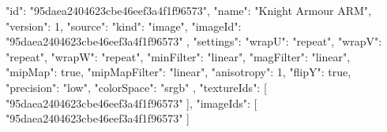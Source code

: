 {
  "id": "95daea2404623cbe46eef3a4f1f96573",
  "name": "Knight Armour ARM",
  "version": 1,
  "source": {
    "kind": "image",
    "imageId": "95daea2404623cbe46eef3a4f1f96573"
  },
  "settings": {
    "wrapU": "repeat",
    "wrapV": "repeat",
    "wrapW": "repeat",
    "minFilter": "linear",
    "magFilter": "linear",
    "mipMap": true,
    "mipMapFilter": "linear",
    "anisotropy": 1,
    "flipY": true,
    "precision": "low",
    "colorSpace": "srgb"
  },
  "textureIds": [
    "95daea2404623cbe46eef3a4f1f96573"
  ],
  "imageIds": [
    "95daea2404623cbe46eef3a4f1f96573"
  ]
}
